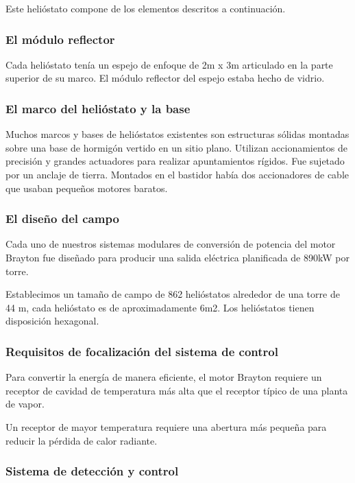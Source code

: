 Este helióstato compone de los elementos descritos a continuación.

\subsubsection{El módulo reflector}

Cada helióstato tenía un espejo de enfoque de 2m x 3m articulado en la parte superior de su marco. El módulo reflector del espejo estaba hecho de vidrio.

\subsubsection{El marco del helióstato y la base}

Muchos marcos y bases de helióstatos existentes son estructuras sólidas montadas sobre una base de hormigón vertido en un sitio plano. Utilizan accionamientos de precisión y grandes actuadores para realizar apuntamientos rígidos. Fue sujetado por un anclaje de tierra. Montados en el bastidor había dos accionadores de cable que usaban pequeños motores baratos.

\subsubsection{El diseño del campo}

Cada uno de nuestros sistemas modulares de conversión de potencia del motor Brayton fue diseñado para producir una salida eléctrica planificada de 890kW por torre.

Establecimos un tamaño de campo de 862 helióstatos alrededor de una torre de 44 m, cada helióstato es de aproximadamente 6m2. Los helióstatos tienen disposición hexagonal.

\subsubsection{Requisitos de focalización del sistema de control}

Para convertir la energía de manera eficiente, el motor Brayton requiere un receptor de cavidad de temperatura más alta que el receptor típico de una planta de vapor.

Un receptor de mayor temperatura requiere una abertura más pequeña para reducir la pérdida de calor radiante.

\subsubsection{Sistema de detección y control}

